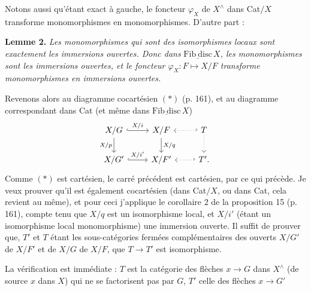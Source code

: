 \documentclass[11pt]{article}
\newcommand{\msp}[1]{\marginpar{\footnotesize [#1]}}
\newcommand{\Fibdisc}{\underline{\mathrm{Fib\ disc}}}
\begin{document}
\msp{page 165}
Notons aussi qu'étant exact à gauche, le foncteur $\varphi_X$ de $X^{\wedge}$ dans Cat$/X$ transforme monomorphismes en monomorphismes. D'autre part :

\textbf{Lemme 2.} \textit{Les monomorphismes qui sont des isomorphismes locaux sont exactement les immersions ouvertes. Donc dans} $\Fibdisc\, X$\textit{, les monomorphismes sont les immersions ouvertes, et le foncteur $\varphi_X : F \longmapsto X/F$ transforme monomorphismes en immersions ouvertes.}

Revenons alors au diagramme cocartésien $(*)$ (p. 161), et au diagramme correspondant dans Cat (et même dans $\Fibdisc\, X$)
\[
\begin{tikzcd}
X/G \ar[r, hook, "X/i"] \ar[d, "X/p"'] & X/F \ar[d, "X/q"] & T \ar[l, hook', dotted] \ar[d, dotted] \\
X/G' \ar[r, hook, "X/i'"] & X/F' & T'. \ar[l, hook', dotted]
\end{tikzcd}
\]
Comme $(*)$ est cartésien, le carré précédent est cartésien, par ce qui précède. Je veux prouver qu'il est également cocartésien
\msp{page 166}
(dans Cat$/X$, ou dans Cat, cela revient au même), et pour ceci j'applique le corollaire 2 de la proposition 15 (p. 161), compte tenu que $X/q$ est un isomorphisme local, et $X/i'$ (étant un isomorphisme local monomorphisme) une immersion ouverte. Il suffit de prouver que, $T'$ et $T$ étant les sous-catégories fermées complémentaires des ouverts $X/G'$ de $X/F'$ et de $X/G$ de $X/F$, que $T \longrightarrow T'$ est isomorphisme.

{\small} %

La vérification est immédiate : $T$ est la catégorie des flèches $x \longrightarrow G$ dans $X^{\wedge}$ (de source $x$ dans $X$) qui ne se factorisent pas par $G$, $T'$ celle des flèches $x \longrightarrow G'$
\end{document}
